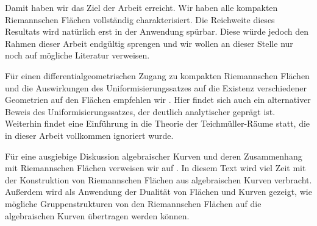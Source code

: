 Damit haben wir das Ziel der Arbeit erreicht. Wir haben alle kompakten
Riemannschen Flächen vollständig charakterisiert. Die Reichweite
dieses Resultats wird natürlich erst in der Anwendung spürbar. Diese
würde jedoch den Rahmen dieser Arbeit endgültig sprengen und wir
wollen an dieser Stelle nur noch auf mögliche Literatur verweisen.

Für einen differentialgeometrischen Zugang zu kompakten Riemannschen
Flächen und die Auswirkungen des Uniformisierungssatzes auf die
Existenz verschiedener Geometrien auf den Flächen empfehlen wir
\cite{Jos}. Hier findet sich auch ein alternativer Beweis des
Uniformisierungssatzes, der deutlich analytischer geprägt
ist. Weiterhin findet eine Einführung in die Theorie der
Teichmüller-Räume statt, die in dieser Arbeit vollkommen ignoriert
wurde.

Für eine ausgiebige Diskussion algebraischer Kurven und deren
Zusammenhang mit Riemannschen Flächen verweisen wir auf
\cite{Mir}. In diesem Text wird viel Zeit mit der Konstruktion von
Riemannschen Flächen aus algebraischen Kurven verbracht. Außerdem wird
als Anwendung der Dualität von Flächen und Kurven gezeigt, wie
mögliche Gruppenstrukturen von den Riemannschen Flächen auf die
algebraischen Kurven übertragen werden können.

